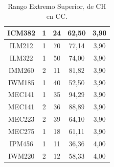 \documentclass[12pt]{article}
\begin{document}
\begin{table}[H]
{{\begin{minipage}[b]{.5\hsize}
{\begin{tabular}{|c|c|c|c|c|}
            \rowcolor[HTML]{DAEBFB} 
            ICM382 & 1 & 24 & 62,50 & 3,90 \\ \hline
            \rowcolor[HTML]{DAEBFB} 
            ILM212 & 1 & 70 & 77,14 & 3,90 \\ \hline
            \rowcolor[HTML]{DAEBFB} 
            ILM322 & 1 & 50 & 74,00 & 3,90 \\ \hline
            \rowcolor[HTML]{DAEBFB} 
            IMM260 & 2 & 11 & 81,82 & 3,90 \\ \hline
            \rowcolor[HTML]{DAEBFB} 
            IWM185 & 1 & 40 & 52,50 & 3,90 \\ \hline
            \rowcolor[HTML]{DAEBFB} 
            MEC141 & 1 & 35 & 94,29 & 3,90 \\ \hline
            \rowcolor[HTML]{DAEBFB} 
            MEC141 & 2 & 36 & 88,89 & 3,90 \\ \hline
            \rowcolor[HTML]{DAEBFB} 
            MEC223 & 2 & 39 & 64,10 & 3,90 \\ \hline
            \rowcolor[HTML]{DAEBFB} 
            MEC275 & 1 & 18 & 61,11 & 3,90 \\ \hline
            \rowcolor[HTML]{DAEBFB} 
            IPM456 & 1 & 11 & 36,36 & 4,00 \\ \hline
            \rowcolor[HTML]{DAEBFB} 
            IWM220 & 2 & 12 & 58,33 & 4,00 \\ \hline
        \end{tabular}}
        \caption{Rango Extremo Superior, de CH en CC.}
    \end{minipage}\hfil
}}
\end{table}
\end{document}
